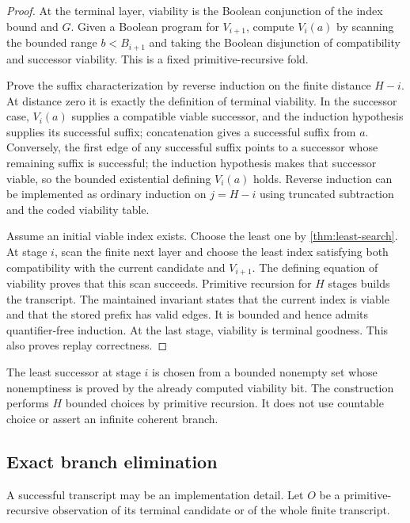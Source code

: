 \begin{proof}
At the terminal layer, viability is the Boolean conjunction of the index bound and $G$.  Given a Boolean program for $V_{i+1}$, compute $V_i(a)$ by scanning the bounded range $b<B_{i+1}$ and taking the Boolean disjunction of compatibility and successor viability.  This is a fixed primitive-recursive fold.

Prove the suffix characterization by reverse induction on the finite distance $H-i$.  At distance zero it is exactly the definition of terminal viability.  In the successor case, $V_i(a)$ supplies a compatible viable successor, and the induction hypothesis supplies its successful suffix; concatenation gives a successful suffix from $a$.  Conversely, the first edge of any successful suffix points to a successor whose remaining suffix is successful; the induction hypothesis makes that successor viable, so the bounded existential defining $V_i(a)$ holds.  Reverse induction can be implemented as ordinary induction on $j=H-i$ using truncated subtraction and the coded viability table.

Assume an initial viable index exists.  Choose the least one by \cref{thm:least-search}.  At stage $i$, scan the finite next layer and choose the least index satisfying both compatibility with the current candidate and $V_{i+1}$.  The defining equation of viability proves that this scan succeeds.  Primitive recursion for $H$ stages builds the transcript.  The maintained invariant states that the current index is viable and that the stored prefix has valid edges.  It is bounded and hence admits quantifier-free induction.  At the last stage, viability is terminal goodness.  This also proves replay correctness.
\end{proof}

\begin{remark}
The least successor at stage $i$ is chosen from a bounded nonempty set whose nonemptiness is proved by the already computed viability bit.  The construction performs $H$ bounded choices by primitive recursion.  It does not use countable choice or assert an infinite coherent branch.
\end{remark}

\subsection{Exact branch elimination}

A successful transcript may be an implementation detail.  Let $O$ be a primitive-recursive observation of its terminal candidate or of the whole finite transcript.

